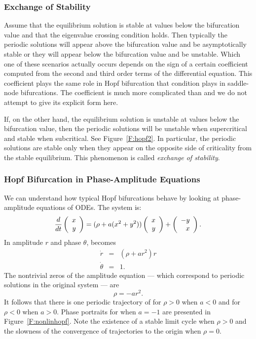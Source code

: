 \subsubsection*{Exchange of Stability}

Assume that the equilibrium solution is stable at values below the 
bifurcation value and that the eigenvalue crossing condition  
holds.  Then typically the periodic solutions will appear above 
the bifurcation value and be asymptotically 
stable or they will 
appear below the bifurcation value and be unstable.  Which one of these 
scenarios actually occurs depends on the sign of a certain coefficient 
computed from the second and third order terms of the differential equation.  
This coefficient plays the same role in Hopf bifurcation that condition 
 plays in saddle-node bifurcations.  The coefficient is 
much more complicated than  and we do not attempt to give 
its explicit form here.

If, on the other hand, the equilibrium solution is unstable at values below 
the bifurcation value, then the periodic solutions will be unstable when
supercritical and stable when subcritical.  See Figure~\ref{F:hopf2}.  In 
particular, the periodic solutions are stable only when they appear on the 
opposite side of criticality from the stable equilibrium.  This phenomenon 
is called {\em exchange of stability\/}.

\subsubsection*{Hopf Bifurcation in Phase-Amplitude Equations}

We can understand how typical Hopf bifurcations behave by looking at
phase-ampli\-tude equations of ODEs. The system is:  
\begin{equation*}  \label{e:nonlinhopf}
\frac{d}{dt}\left(\begin{array}{r} x \\ y\end{array}\right) = (\rho +a(x^2+y^2))\left(\begin{array}{r} x \\ y\end{array}\right) + \left(\begin{array}{r} -y \\ x\end{array}\right).
\end{equation*}
In amplitude $r$ and phase $\theta$,  becomes
\begin{eqnarray*}
\dot{r} & = & (\rho+ar^2)r \\
\dot{\theta} & = & 1.
\end{eqnarray*}
The nontrivial zeros of the amplitude equation --- which correspond to 
periodic solutions in the original system --- are 
\[
\rho = -a r^2.
\]
It follows that there is one periodic trajectory of 
for $\rho>0$ when $a<0$ and for $\rho<0$ when $a>0$.  
Phase portraits for  when $a=-1$ are presented in 
Figure~\ref{F:nonlinhopf}.  Note the existence of a stable limit 
cycle
when $\rho>0$ and the slowness of the convergence of trajectories 
to the origin when $\rho=0$.

